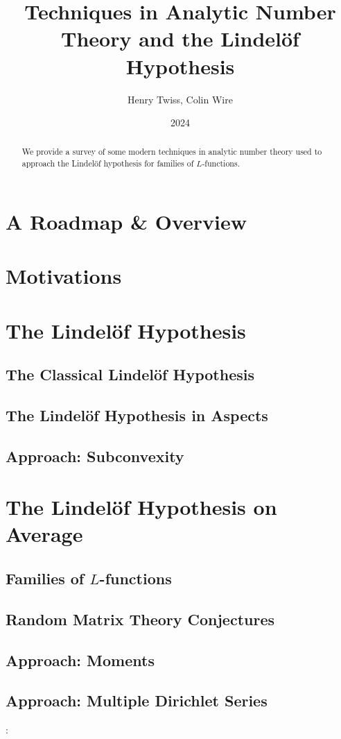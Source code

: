 \documentclass[12pt,reqno,oneside]{amsart}
\title{Techniques in Analytic Number Theory and the Lindel\"of Hypothesis}
\author{Henry Twiss, Colin Wire}
\date{2024}
\begin{document}
\begin{abstract}
    We provide a survey of some modern techniques in analytic number theory used to approach the Lindel\"of hypothesis for families of $L$-functions.
\end{abstract}

\maketitle

\section{A Roadmap \& Overview}
\section{Motivations}
\section{The Lindel\"of Hypothesis}
    \subsection*{The Classical Lindel\"of Hypothesis}
    \subsection*{The Lindel\"of Hypothesis in Aspects}
    \subsection*{Approach: Subconvexity}
\section{The Lindel\"of Hypothesis on Average}
    \subsection*{Families of \texorpdfstring{$L$}{L}-functions}
    \subsection*{Random Matrix Theory Conjectures}
    \subsection*{Approach: Moments}
    \subsection*{Approach: Multiple Dirichlet Series}:

\begin{thebibliography}{99}
\end{thebibliography}
\end{document}
